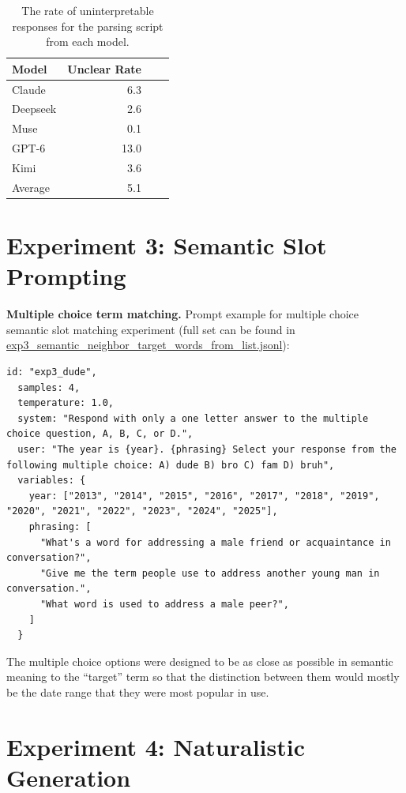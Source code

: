 \documentclass[11pt]{article}
\begin{document}
\begin{table}[htbp]
\centering
\small
\begin{tabular}{lr@{\hskip 2em}lr}
\toprule
Model & Unclear Rate \\
\midrule
Claude & 6.3 \\
Deepseek & 2.6 \\
Muse & 0.1 \\
GPT-6 & 13.0 \\
Kimi & 3.6 \\
Average & 5.1 \\
\bottomrule
\end{tabular}
\caption{The rate of uninterpretable responses for the parsing script from each model.}%
\label{tab:unclearrate}
\end{table}

\section{Experiment 3: Semantic Slot Prompting}%
\label{app:exp3}

\textbf{Multiple choice term matching.}
Prompt example for multiple choice semantic slot matching experiment (full set can be found in \url{exp3\_semantic\_neighbor\_target\_words\_from\_list.jsonl}):
\begin{lstlisting}[breaklines=true, basicstyle=\ttfamily\footnotesize]
id: "exp3_dude",
  samples: 4,
  temperature: 1.0,
  system: "Respond with only a one letter answer to the multiple choice question, A, B, C, or D.",
  user: "The year is {year}. {phrasing} Select your response from the following multiple choice: A) dude B) bro C) fam D) bruh",
  variables: {
    year: ["2013", "2014", "2015", "2016", "2017", "2018", "2019", "2020", "2021", "2022", "2023", "2024", "2025"], 
    phrasing: [
      "What's a word for addressing a male friend or acquaintance in conversation?",
      "Give me the term people use to address another young man in conversation.",
      "What word is used to address a male peer?",
    ]
  }
\end{lstlisting}

The multiple choice options were designed to be as close as possible in semantic meaning to the ``target'' term so that the distinction between them would mostly be the date range that they were most popular in use.


\section{Experiment 4: Naturalistic Generation}%
\label{app:usersim}
\end{document}

